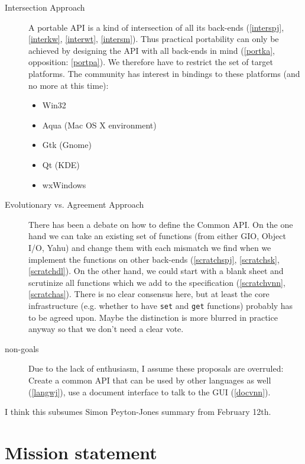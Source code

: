 \documentclass{article}
\begin{document}
\begin{description}
\item[Intersection Approach] A portable API is a kind of intersection
  of all its back-ends (\ref{interspj}, \ref{interkw}, \ref{interwt},
  \ref{intersm}). Thus practical portability can only be achieved by
  designing the API with all back-ends in mind (\ref{portka},
  opposition: \ref{portpa}). We therefore have to restrict the set of
  target platforms. The community has interest in bindings to these
  platforms (and no more at this time):
  \begin{itemize}
  \item Win32
  \item Aqua (Mac OS X environment)
  \item Gtk (Gnome)
  \item Qt (KDE)
  \item wxWindows
  \end{itemize}
\item[Evolutionary vs. Agreement Approach] There has been a debate on
  how to define the Common API. On the one hand we can take an
  existing set of functions (from either GIO, Object I/O, Yahu) and
  change them with each mismatch we find when we implement the
  functions on other back-ends (\ref{scratchspj}, \ref{scratchsk},
  \ref{scratchdl}). On the other hand, we could start with a blank
  sheet and scrutinize all functions which we add to the specification
  (\ref{scratchvnn}, \ref{scratchas}). There is no clear consensus
  here, but at least the core infrastructure (e.g. whether to have
  \verb+set+ and \verb+get+ functions) probably has to be agreed upon.
  Maybe the distinction is more blurred in practice anyway so that we
  don't need a clear vote.
\item[non-goals] Due to the lack of enthusiasm, I assume these
  proposals are overruled: Create a common API that can be used by
  other languages as well (\ref{langwj}), use a document interface to
  talk to the GUI (\ref{docvnn}).
\end{description}

\noindent I think this subsumes Simon Peyton-Jones summary from February 12th. 

\section{Mission statement}
\end{document}
